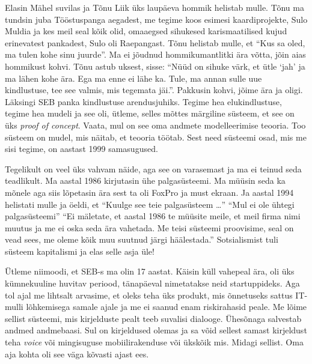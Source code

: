 Elasin Mähel suvilas ja Tõnu Liik üks laupäeva hommik helistab mulle. Tõnu ma 
tundsin juba Tööstuspanga aegadest, me tegime koos  esimesi kaardiprojekte, 
Sulo Muldia ja kes meil seal kõik olid, omaaegsed 
sihukesed karismaatilised kujud erinevatest pankadest, Sulo oli 
Raepangast. Tõnu helistab mulle, et \enquote{Kus sa oled, 
ma tulen kohe sinu juurde}. Ma ei jõudnud hommikumantlitki ära võtta, jõin aias 
hommikust kohvi. Tõnu astub uksest, sisse: \enquote{Nüüd on sihuke värk, et 
ütle \enquote{jah} ja ma lähen kohe ära. Ega ma enne ei lähe ka. Tule, ma annan 
sulle uue kindlustuse, tee see valmis, mis tegemata jäi.}.  Pakkusin kohvi, 
jõime ära ja oligi. Läksingi SEB panka kindlustuse 
arendusjuhiks. Tegime hea elukindlustuse, tegime hea mudeli ja see oli, ütleme, 
selles mõttes märgiline süsteem, et see on üks \emph{proof of concept}. Vaata, 
mul on see oma andmete modelleerimise teooria. Too süsteem on mudel, mis 
näitab, et teooria töötab. Sest need süsteemi osad, mis me sisi tegime, on 
aastast 1999 samasugused. 


Tegelikult on veel üks vahvam näide, aga see on varasemast ja ma ei teinud seda 
teadlikult. Ma aastal 1986 kirjutasin ühe palgasüsteemi. Ma müüsin seda ka 
mõnele aga siis lõpetasin ära sest ta oli FoxPro ja must ekraan. Ja aastal 1994 
helistati mulle ja öeldi, et \enquote{Kuulge see teie palgasüsteem \ldots} 
\enquote{Mul ei ole ühtegi palgasüsteemi} \enquote{Ei mäletate, et aastal 1986 
te müüsite meile, et meil firma nimi muutus ja me ei oska seda ära vahetada. Me 
teisi  süsteemi proovisime, seal on vead sees, me oleme kõik muu suutnud järgi 
häälestada.} Sotsialismist tuli süsteem kapitalismi ja elas selle asja üle! 


Ütleme niimoodi, et SEB-s ma olin 17 aastat. Käisin küll 
vahepeal ära,  oli üks kümnekuuline huvitav periood, tänapäeval nimetatakse 
neid startuppideks. Aga tol ajal me  lihtsalt arvasime, et oleks teha üks 
produkt, mis  õnnetuseks sattus IT-mulli lõhkemisega samale ajale ja me ei 
saanud enam riskirahasid peale. Me lõime sellist süsteemi, mis kirjelduste 
pealt teeb suvalisi dialooge. Ühesõnaga salvestab andmed andmebaasi. Sul on 
kirjeldused olemas ja sa võid sellest samast kirjeldust teha \emph{voice} või 
mingisuguse mobiilirakenduse või ükskõik mis.  Midagi sellist. Oma aja kohta  
oli see väga kõvasti ajast ees.

